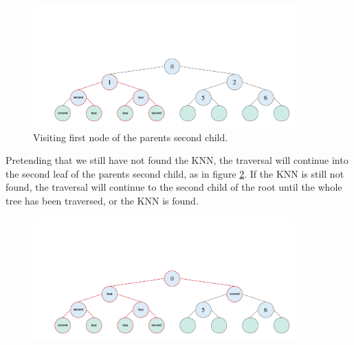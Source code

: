 
\begin{figure}[H]
\centering
\includegraphics[width=0.9\textwidth]{pics/kd-tree-visual/7.png}
\caption{Visiting first node of the parents second child.}
\label{fig:t3}
\end{figure}

\noindent Pretending that we still have not found the KNN, the traversal will continue into the second leaf of the parents second child, as in figure \ref{fig:t5}. If the KNN is still not found, the traversal will continue to the second child of the root until the whole tree has been traversed, or the KNN is found. 




\begin{figure}[H]
\centering
\includegraphics[width=0.9\textwidth]{pics/kd-tree-visual/11.png}
\caption{}
\label{fig:t5}
\end{figure}




